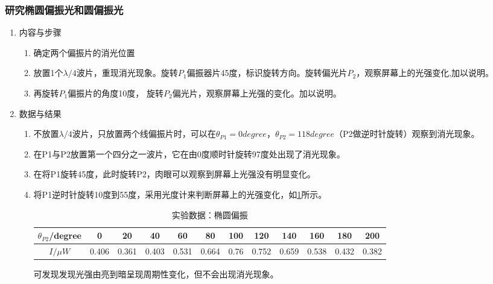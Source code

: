 \documentclass[dvipsnames, svgnames,a4paper,11pt]{article}
\begin{document}
	\subsubsection{研究椭圆偏振光和圆偏振光}
	\begin{enumerate}
		\item 内容与步骤
		
		\begin{enumerate}
			\item 确定两个偏振片的消光位置
			\item 放置1个$\lambda/4$波片，重现消光现象。旋转$P_1$偏振器片45度，标识旋转方向。旋转偏光片$P_2$，观察屏幕上的光强变化,加以说明。
			\item 再旋转$P_1$偏振片的角度10度， 旋转$P_2$偏光片，观察屏幕上光强的变化。加以说明。
			
		\end{enumerate}
		
		\item 数据与结果
		
		\begin{enumerate}
			\item 不放置$\lambda/4$波片，只放置两个线偏振片时，可以在$\theta_{P1}=0 degree$，$\theta_{P2}=118 degree$（P2做逆时针旋转）观察到消光现象。
			
			\item 在P1与P2放置第一个四分之一波片，它在由0度顺时针旋转97度处出现了消光现象。
			
			\item 在将P1旋转45度，此时旋转P2，肉眼可以观察到屏幕上光强没有明显变化。
			
			\item 将P1逆时针旋转10度到55度，采用光度计来判断屏幕上的光强变化，如\cref{tab:tab4}所示。
			
			\begin{table}[h]
				\centering
				\caption{实验数据：椭圆偏振}
				\label{tab:tab4}
				\begin{tabular}{|c|c|c|c|c|c|c|c|c|c|c|c|}
					\hline
					$\theta_{P2}$/degree & 0 & 20 & 40 & 60 & 80 & 100 & 120 & 140 & 160 & 180 & 200 \\
					\hline
					$I/\mu W$ & 0.406 & 0.361 & 0.403 & 0.531 & 0.664 & 0.76 & 0.752 & 0.659 & 0.538 & 0.432 & 0.382 \\
					\hline
				\end{tabular}
			\end{table}
			
			可发现发现光强由亮到暗呈现周期性变化，但不会出现消光现象。
			
		\end{enumerate}
		
	\end{enumerate}	
	
\end{document}
